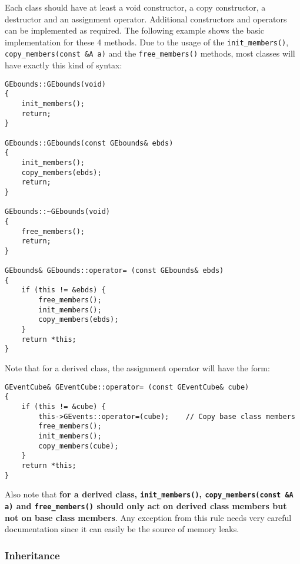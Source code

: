 \documentclass{article}[12pt,a4]
\begin{document}
Each class should have at least a void constructor, a copy constructor, a destructor and
an assignment operator.
Additional constructors and operators can be implemented as required.
The following example shows the basic implementation for these 4 methods.
Due to the usage of the {\tt init\_members()}, {\tt copy\_members(const \&A a)} and the
{\tt free\_members()} methods, most classes will have exactly this kind of syntax:
\begin{verbatim}
GEbounds::GEbounds(void)
{
    init_members();
    return;
}

GEbounds::GEbounds(const GEbounds& ebds)
{
    init_members();
    copy_members(ebds);
    return;
}

GEbounds::~GEbounds(void)
{
    free_members();
    return;
}

GEbounds& GEbounds::operator= (const GEbounds& ebds)
{
    if (this != &ebds) {
        free_members();
        init_members();
        copy_members(ebds);
    }
    return *this;
}
\end{verbatim}
Note that for a derived class, the assignment operator will have the form:
\begin{verbatim}
GEventCube& GEventCube::operator= (const GEventCube& cube)
{
    if (this != &cube) {
        this->GEvents::operator=(cube);    // Copy base class members
        free_members();
        init_members();
        copy_members(cube);
    }
    return *this;
}
\end{verbatim}
Also note that {\bf for a derived class, {\tt init\_members()}, {\tt copy\_members(const \&A a)}
and {\tt free\_members()} should only act on derived class members but not on
base class members}.
Any exception from this rule needs very careful documentation since it can easily be
the source of memory leaks.


\subsubsection{Inheritance}
\end{document}
